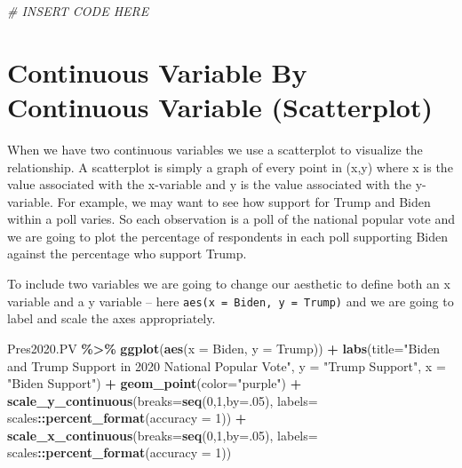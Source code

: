 \documentclass[
]{article}
\newenvironment{Shaded}{\begin{snugshade}}{\end{snugshade}}
\newcommand{\AttributeTok}[1]{\textcolor[rgb]{0.13,0.29,0.53}{#1}}
\newcommand{\CommentTok}[1]{\textcolor[rgb]{0.56,0.35,0.01}{\textit{#1}}}
\newcommand{\DecValTok}[1]{\textcolor[rgb]{0.00,0.00,0.81}{#1}}
\newcommand{\FunctionTok}[1]{\textcolor[rgb]{0.13,0.29,0.53}{\textbf{#1}}}
\newcommand{\NormalTok}[1]{#1}
\newcommand{\SpecialCharTok}[1]{\textcolor[rgb]{0.81,0.36,0.00}{\textbf{#1}}}
\newcommand{\StringTok}[1]{\textcolor[rgb]{0.31,0.60,0.02}{#1}}
\begin{document}
\begin{Shaded}
\begin{Highlighting}[]
\CommentTok{\# INSERT CODE HERE}
\end{Highlighting}
\end{Shaded}

\section{Continuous Variable By Continuous Variable
(Scatterplot)}\label{continuous-variable-by-continuous-variable-scatterplot}

When we have two continuous variables we use a scatterplot to visualize
the relationship. A scatterplot is simply a graph of every point in
(x,y) where x is the value associated with the x-variable and y is the
value associated with the y-variable. For example, we may want to see
how support for Trump and Biden within a poll varies. So each
observation is a poll of the national popular vote and we are going to
plot the percentage of respondents in each poll supporting Biden against
the percentage who support Trump.

To include two variables we are going to change our aesthetic to define
both an x variable and a y variable -- here
\texttt{aes(x\ =\ Biden,\ y\ =\ Trump)} and we are going to label and
scale the axes appropriately.

\begin{Shaded}
\begin{Highlighting}[]
\NormalTok{Pres2020.PV }\SpecialCharTok{\%\textgreater{}\%}
  \FunctionTok{ggplot}\NormalTok{(}\FunctionTok{aes}\NormalTok{(}\AttributeTok{x =}\NormalTok{ Biden, }\AttributeTok{y =}\NormalTok{ Trump)) }\SpecialCharTok{+} 
  \FunctionTok{labs}\NormalTok{(}\AttributeTok{title=}\StringTok{"Biden and Trump Support in 2020 National Popular Vote"}\NormalTok{,}
       \AttributeTok{y =} \StringTok{"Trump Support"}\NormalTok{,}
       \AttributeTok{x =} \StringTok{"Biden Support"}\NormalTok{) }\SpecialCharTok{+} 
  \FunctionTok{geom\_point}\NormalTok{(}\AttributeTok{color=}\StringTok{"purple"}\NormalTok{) }\SpecialCharTok{+} 
    \FunctionTok{scale\_y\_continuous}\NormalTok{(}\AttributeTok{breaks=}\FunctionTok{seq}\NormalTok{(}\DecValTok{0}\NormalTok{,}\DecValTok{1}\NormalTok{,}\AttributeTok{by=}\NormalTok{.}\DecValTok{05}\NormalTok{),}
                     \AttributeTok{labels=}\NormalTok{ scales}\SpecialCharTok{::}\FunctionTok{percent\_format}\NormalTok{(}\AttributeTok{accuracy =} \DecValTok{1}\NormalTok{)) }\SpecialCharTok{+}
  \FunctionTok{scale\_x\_continuous}\NormalTok{(}\AttributeTok{breaks=}\FunctionTok{seq}\NormalTok{(}\DecValTok{0}\NormalTok{,}\DecValTok{1}\NormalTok{,}\AttributeTok{by=}\NormalTok{.}\DecValTok{05}\NormalTok{),}
                     \AttributeTok{labels=}\NormalTok{ scales}\SpecialCharTok{::}\FunctionTok{percent\_format}\NormalTok{(}\AttributeTok{accuracy =} \DecValTok{1}\NormalTok{))}
\end{Highlighting}
\end{Shaded}
\end{document}
